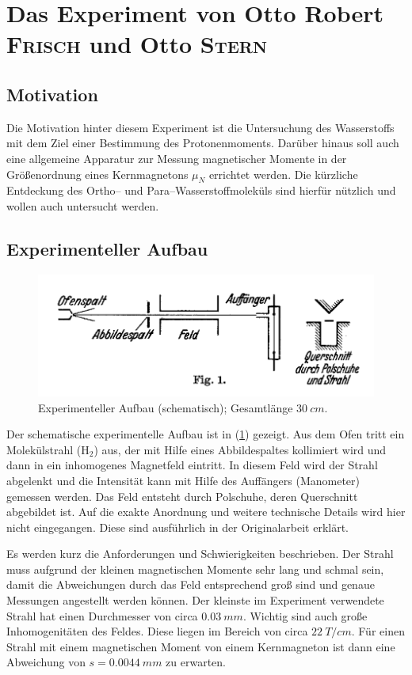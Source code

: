 \documentclass[sn-mathphys-num,iicol]{sn-jnl}
\theoremstyle{thmstyleone}
\theoremstyle{thmstyletwo}
\theoremstyle{thmstylethree}
\begin{document}
\section{Das Experiment von Otto Robert \textsc{Frisch} und Otto \textsc{Stern}}
\subsection{Motivation}
Die Motivation hinter diesem Experiment ist die Untersuchung des Wasserstoffs mit dem Ziel einer Bestimmung des Protonenmoments.
Darüber hinaus soll auch eine allgemeine Apparatur zur Messung magnetischer Momente in der Größenordnung eines Kernmagnetons $\mu _N$ errichtet werden.
Die kürzliche Entdeckung des Ortho-- und Para--Wasserstoffmoleküls sind hierfür nützlich und wollen auch untersucht werden.

\subsection{Experimenteller Aufbau}
\begin{figure}[h]
        \includegraphics[width=.5\textwidth]{../vortrag/prosi_versuchsaufbau_mag_moment.png}
        \caption{Experimenteller Aufbau (schematisch); Gesamtlänge $\SI{30}{cm}$.\cite{FrischStern1933}}\label{fig:experimenteller_aufbau_frisch_stern}
\end{figure}
\noindent Der schematische experimentelle Aufbau ist in (\ref{fig:experimenteller_aufbau_frisch_stern}) gezeigt.
Aus dem Ofen tritt ein Molekülstrahl ($\text{H}_2$) aus, der mit Hilfe eines Abbildespaltes kollimiert wird und dann in ein inhomogenes Magnetfeld eintritt.
In diesem Feld wird der Strahl abgelenkt und die Intensität kann mit Hilfe des Auffängers (Manometer) gemessen werden.
Das Feld entsteht durch Polschuhe, deren Querschnitt abgebildet ist.
Auf die exakte Anordnung und weitere technische Details wird hier nicht eingegangen.
Diese sind ausführlich in der Originalarbeit\cite{FrischStern1933} erklärt.

Es werden kurz die Anforderungen und Schwierigkeiten beschrieben.
Der Strahl muss aufgrund der kleinen magnetischen Momente sehr lang und schmal sein, damit die Abweichungen durch das Feld entsprechend groß sind und genaue Messungen angestellt werden können.
Der kleinste im Experiment verwendete Strahl hat einen Durchmesser von circa $\SI{0.03}{mm}$.
Wichtig sind auch große Inhomogenitäten des Feldes.
Diese liegen im Bereich von circa $\SI{22}{T/cm}$.
Für einen Strahl mit einem magnetischen Moment von einem Kernmagneton ist dann eine Abweichung von $s=\SI{0.0044}{mm}$ zu erwarten.
\end{document}
